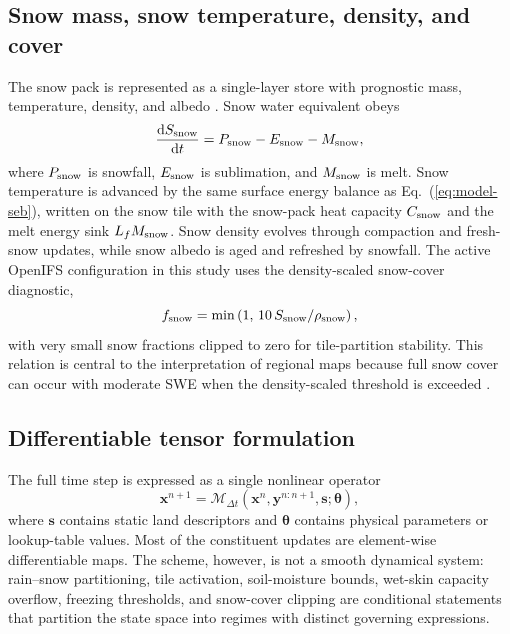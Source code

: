 \subsection{Snow mass, snow temperature, density, and cover}

The snow pack is represented as a single-layer store with prognostic mass,
temperature, density, and albedo
\citep{ViterboBeljaars1995,Dutra2010Snow,ECMWFIFSPartIV}.  Snow water equivalent obeys
\begin{equation}
  \frac{{\rm d}S_{\rm snow}}{{\rm d}t}
  = P_{\rm snow} - E_{\rm snow} - M_{\rm snow},
\label{eq:model-swe}
\end{equation}
where $P_{\rm snow}$ is snowfall, $E_{\rm snow}$ is sublimation, and
$M_{\rm snow}$ is melt.  Snow temperature is advanced by the same surface
energy balance as Eq.~(\ref{eq:model-seb}), written on the snow tile with the
snow-pack heat capacity $C_{\rm snow}$ and the melt energy sink $L_f
M_{\rm snow}$.  Snow density evolves through compaction and fresh-snow updates, while snow
albedo is aged and refreshed by snowfall.  The active OpenIFS configuration
in this study uses the density-scaled snow-cover diagnostic,
\begin{equation}
  f_{\rm snow} =
  \min\left(1,\,10\,S_{\rm snow}/\rho_{\rm snow}\right),
\label{eq:model-fsnow}
\end{equation}
with very small snow fractions clipped to zero for tile-partition stability.
This relation is central to the interpretation of regional maps because full
snow cover can occur with moderate SWE when the density-scaled threshold is
exceeded \citep{ECMWFIFSPartIV,Boussetta2021ECLand}.

\subsection{Differentiable tensor formulation}
\label{sec:tensor-formulation}

The full time step is expressed as a single nonlinear operator
\begin{equation}
  \mathbf{x}^{n+1}
  =
  \mathcal{M}_{\Delta t}
  \left(\mathbf{x}^{n}, \mathbf{y}^{n:n+1}, \mathbf{s}; \boldsymbol{\theta}\right),
\label{eq:model-step}
\end{equation}
where $\mathbf{s}$ contains static land descriptors and $\boldsymbol{\theta}$
contains physical parameters or lookup-table values.  Most of the constituent
updates are element-wise differentiable maps.  The scheme, however, is not a
smooth dynamical system: rain--snow partitioning, tile activation, soil-moisture
bounds, wet-skin capacity overflow, freezing thresholds, and snow-cover
clipping are conditional statements that partition the
state space into regimes with distinct governing expressions.

